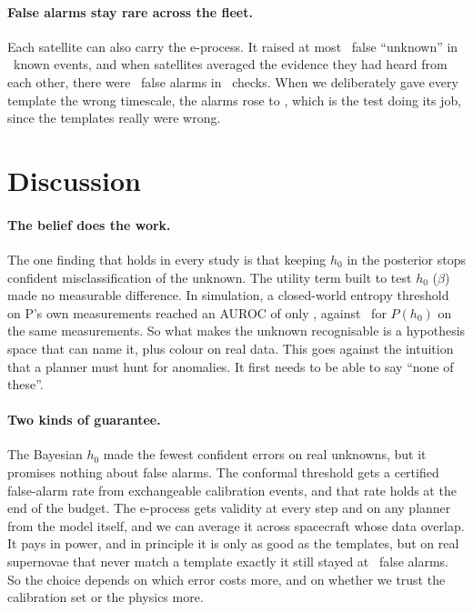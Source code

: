 \documentclass{jaa}
\begin{document}
\paragraph{False alarms stay rare across the fleet.} Each satellite can also carry the e-process. It raised at most \FleetHEOneMaxK\ false ``unknown'' in \FleetHEOneN\ known events, and when satellites averaged the evidence they had heard from each other, there were \FleetHETwoK\ false alarms in \FleetHETwoN\ checks. When we deliberately gave every template the wrong timescale, the alarms rose to \FleetMEFalseUnknownO, which is the test doing its job, since the templates really were wrong.

\section{Discussion}\label{sec:disc}

\paragraph{The belief does the work.} The one finding that holds in every study is that keeping $h_0$ in the posterior stops confident misclassification of the unknown. The utility term built to test $h_0$ ($\beta$) made no measurable difference. In simulation, a closed-world entropy threshold on P's own measurements reached an AUROC of only \SimAucPown, against \SimAucP\ for $P(h_0)$ on the same measurements. So what makes the unknown recognisable is a hypothesis space that can name it, plus colour on real data. This goes against the intuition that a planner must hunt for anomalies. It first needs to be able to say ``none of these''.

\paragraph{Two kinds of guarantee.} The Bayesian $h_0$ made the fewest confident errors on real unknowns, but it promises nothing about false alarms. The conformal threshold gets a certified false-alarm rate from exchangeable calibration events, and that rate holds at the end of the budget. The e-process gets validity at every step and on any planner from the model itself, and we can average it across spacecraft whose data overlap. It pays in power, and in principle it is only as good as the templates, but on real supernovae that never match a template exactly it still stayed at \EFreshFa\ false alarms. So the choice depends on which error costs more, and on whether we trust the calibration set or the physics more.
\end{document}
